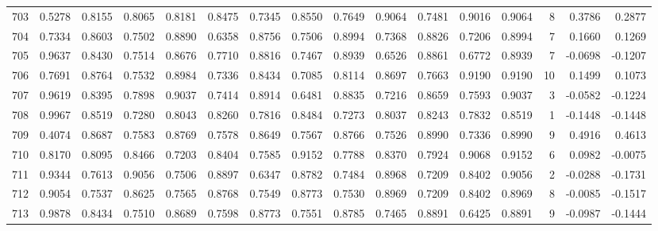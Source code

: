 \begin{tabular}{lrrrrrrrrrrrrrrr}
703 &      0.5278 &  0.8155 &  0.8065 &  0.8181 &  0.8475 &  0.7345 &  0.8550 &  0.7649 &  0.9064 &  0.7481 &   0.9016 &     0.9064 &      8 &                    0.3786 &                     0.2877 \\
704 &      0.7334 &  0.8603 &  0.7502 &  0.8890 &  0.6358 &  0.8756 &  0.7506 &  0.8994 &  0.7368 &  0.8826 &   0.7206 &     0.8994 &      7 &                    0.1660 &                     0.1269 \\
705 &      0.9637 &  0.8430 &  0.7514 &  0.8676 &  0.7710 &  0.8816 &  0.7467 &  0.8939 &  0.6526 &  0.8861 &   0.6772 &     0.8939 &      7 &                   -0.0698 &                    -0.1207 \\
706 &      0.7691 &  0.8764 &  0.7532 &  0.8984 &  0.7336 &  0.8434 &  0.7085 &  0.8114 &  0.8697 &  0.7663 &   0.9190 &     0.9190 &     10 &                    0.1499 &                     0.1073 \\
707 &      0.9619 &  0.8395 &  0.7898 &  0.9037 &  0.7414 &  0.8914 &  0.6481 &  0.8835 &  0.7216 &  0.8659 &   0.7593 &     0.9037 &      3 &                   -0.0582 &                    -0.1224 \\
708 &      0.9967 &  0.8519 &  0.7280 &  0.8043 &  0.8260 &  0.7816 &  0.8484 &  0.7273 &  0.8037 &  0.8243 &   0.7832 &     0.8519 &      1 &                   -0.1448 &                    -0.1448 \\
709 &      0.4074 &  0.8687 &  0.7583 &  0.8769 &  0.7578 &  0.8649 &  0.7567 &  0.8766 &  0.7526 &  0.8990 &   0.7336 &     0.8990 &      9 &                    0.4916 &                     0.4613 \\
710 &      0.8170 &  0.8095 &  0.8466 &  0.7203 &  0.8404 &  0.7585 &  0.9152 &  0.7788 &  0.8370 &  0.7924 &   0.9068 &     0.9152 &      6 &                    0.0982 &                    -0.0075 \\
711 &      0.9344 &  0.7613 &  0.9056 &  0.7506 &  0.8897 &  0.6347 &  0.8782 &  0.7484 &  0.8968 &  0.7209 &   0.8402 &     0.9056 &      2 &                   -0.0288 &                    -0.1731 \\
712 &      0.9054 &  0.7537 &  0.8625 &  0.7565 &  0.8768 &  0.7549 &  0.8773 &  0.7530 &  0.8969 &  0.7209 &   0.8402 &     0.8969 &      8 &                   -0.0085 &                    -0.1517 \\
713 &      0.9878 &  0.8434 &  0.7510 &  0.8689 &  0.7598 &  0.8773 &  0.7551 &  0.8785 &  0.7465 &  0.8891 &   0.6425 &     0.8891 &      9 &                   -0.0987 &                    -0.1444 \\

\end{tabular}
